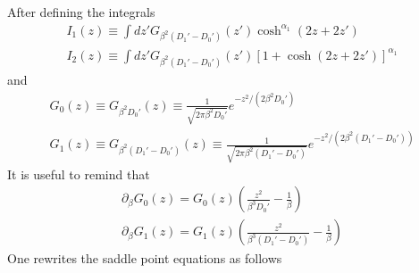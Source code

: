 \documentclass[onecolumn,superscriptaddress,pr]{revtex4}
\begin{document}
After defining the  integrals
%
\begin{align}
I_1(z)\equiv \int dz'G_{\beta^2(D_1'-D_0')}(z')\cosh^{\alpha_1}(2z+2z')\\
I_2(z)\equiv \int dz'G_{\beta^2(D_1'-D_0')}(z')\left[1+\cosh(2z+2z')\right]^{\alpha_1}
\end{align}
%
and
%
\begin{align}
G_0(z)\equiv G_{\beta^2D_0'}(z)\equiv\frac{1}{\sqrt{2\pi \beta^2 D_0'}}e^{-z^2/(2\beta^2 D_0')}\\
G_1(z)\equiv G_{\beta^2(D_1'-D_0')}(z)\equiv\frac{1}{\sqrt{2\pi \beta^2 (D_1'-D_0')}}e^{-z^2/(2\beta^2 (D_1'-D_0'))}
\end{align}
%
It is useful to remind that
%
\begin{align}
\partial_\beta G_{0}(z)=G_0(z)\left(\frac{z^2}{\beta^3D_0'}-\frac{1}{\beta}\right)\\
\partial_\beta G_{1}(z)=G_1(z)\left(\frac{z^2}{\beta^3(D_1'-D_0')}-\frac{1}{\beta}\right)
\end{align}
%
One rewrites the saddle point equations as follows
\end{document}
